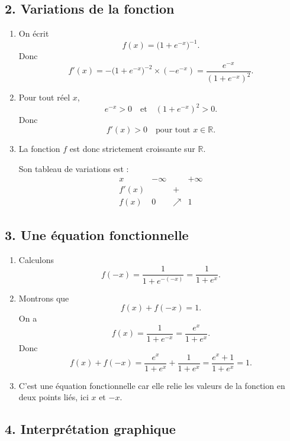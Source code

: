 \documentclass[11pt,a4paper]{article}
\begin{document}
\subsection*{2. Variations de la fonction}

\begin{enumerate}
    \item On écrit
    \[
    f(x)=\bigl(1+e^{-x}\bigr)^{-1}.
    \]
    Donc
    \[
    f'(x)=-\bigl(1+e^{-x}\bigr)^{-2}\times(-e^{-x})
    =\frac{e^{-x}}{(1+e^{-x})^2}.
    \]

    \item Pour tout réel \(x\),
    \[
    e^{-x}>0 \quad \text{et} \quad (1+e^{-x})^2>0.
    \]
    Donc
    \[
    f'(x)>0 \quad \text{pour tout } x\in\mathbb{R}.
    \]

    \item La fonction \(f\) est donc strictement croissante sur \(\mathbb{R}\).

    Son tableau de variations est :
    \[
    \begin{array}{c|ccc}
    x & -\infty & & +\infty \\
    \hline
    f'(x) & & + & \\
    \hline
    f(x) & 0 & \nearrow & 1
    \end{array}
    \]
\end{enumerate}

\subsection*{3. Une équation fonctionnelle}

\begin{enumerate}
    \item Calculons
    \[
    f(-x)=\frac{1}{1+e^{-(-x)}}=\frac{1}{1+e^x}.
    \]

    \item Montrons que
    \[
    f(x)+f(-x)=1.
    \]
    On a
    \[
    f(x)=\frac{1}{1+e^{-x}}=\frac{e^x}{1+e^x}.
    \]
    Donc
    \[
    f(x)+f(-x)=\frac{e^x}{1+e^x}+\frac{1}{1+e^x}
    =\frac{e^x+1}{1+e^x}=1.
    \]

    \item C'est une équation fonctionnelle car elle relie les valeurs de la fonction en deux points liés, ici \(x\) et \(-x\).
\end{enumerate}

\subsection*{4. Interprétation graphique}
\end{document}
